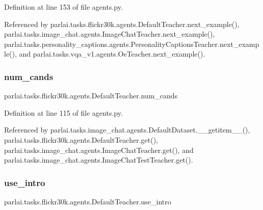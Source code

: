 Definition at line 153 of file agents.\+py.



Referenced by parlai.\+tasks.\+flickr30k.\+agents.\+Default\+Teacher.\+next\+\_\+example(), parlai.\+tasks.\+image\+\_\+chat.\+agents.\+Image\+Chat\+Teacher.\+next\+\_\+example(), parlai.\+tasks.\+personality\+\_\+captions.\+agents.\+Personality\+Captions\+Teacher.\+next\+\_\+example(), and parlai.\+tasks.\+vqa\+\_\+v1.\+agents.\+Oe\+Teacher.\+next\+\_\+example().

\mbox{\label{classparlai_1_1tasks_1_1flickr30k_1_1agents_1_1DefaultTeacher_ab11d2ec093158073e7188bcc4170c56a}} 
\subsubsection{\texorpdfstring{num\+\_\+cands}{num\_cands}}
{\footnotesize\ttfamily parlai.\+tasks.\+flickr30k.\+agents.\+Default\+Teacher.\+num\+\_\+cands}



Definition at line 115 of file agents.\+py.



Referenced by parlai.\+tasks.\+image\+\_\+chat.\+agents.\+Default\+Dataset.\+\_\+\+\_\+getitem\+\_\+\+\_\+(), parlai.\+tasks.\+flickr30k.\+agents.\+Default\+Teacher.\+get(), parlai.\+tasks.\+image\+\_\+chat.\+agents.\+Image\+Chat\+Teacher.\+get(), and parlai.\+tasks.\+image\+\_\+chat.\+agents.\+Image\+Chat\+Test\+Teacher.\+get().

\mbox{\label{classparlai_1_1tasks_1_1flickr30k_1_1agents_1_1DefaultTeacher_a26c3c801b4cd7566cf554c6398e893ce}} 
\subsubsection{\texorpdfstring{use\+\_\+intro}{use\_intro}}
{\footnotesize\ttfamily parlai.\+tasks.\+flickr30k.\+agents.\+Default\+Teacher.\+use\+\_\+intro}



